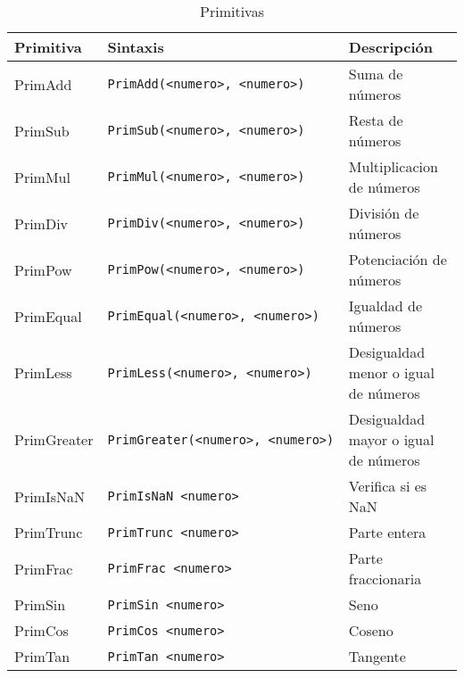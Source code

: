       \begin{longtable}[c]{lll}
         \caption{Primitivas}\label{tb:primitives}\\ \hline
         {\bf Primitiva} & {\bf Sintaxis} & {\bf Descripción} \\ \hline
         PrimAdd              & \texttt{PrimAdd(<numero>,~<numero>)              } & Suma de números                                  \\
         PrimSub              & \texttt{PrimSub(<numero>,~<numero>)              } & Resta de números                                 \\
         PrimMul              & \texttt{PrimMul(<numero>,~<numero>)              } & Multiplicacion de números                        \\
         PrimDiv              & \texttt{PrimDiv(<numero>,~<numero>)              } & División de números                              \\
         PrimPow              & \texttt{PrimPow(<numero>,~<numero>)              } & Potenciación de números                          \\
         PrimEqual            & \texttt{PrimEqual(<numero>,~<numero>)            } & Igualdad de números                              \\
         PrimLess             & \texttt{PrimLess(<numero>,~<numero>)             } & Desigualdad menor o igual de números             \\
         PrimGreater          & \texttt{PrimGreater(<numero>,~<numero>)          } & Desigualdad mayor o igual de números             \\
         PrimIsNaN            & \texttt{PrimIsNaN~<numero>                       } & Verifica si es NaN                               \\
         PrimTrunc            & \texttt{PrimTrunc~<numero>                       } & Parte entera                                     \\
         PrimFrac             & \texttt{PrimFrac~<numero>                        } & Parte fraccionaria                               \\
         PrimSin              & \texttt{PrimSin~<numero>                         } & Seno                                             \\
         PrimCos              & \texttt{PrimCos~<numero>                         } & Coseno                                           \\
         PrimTan              & \texttt{PrimTan~<numero>                         } & Tangente                                         \\

\end{longtable}
